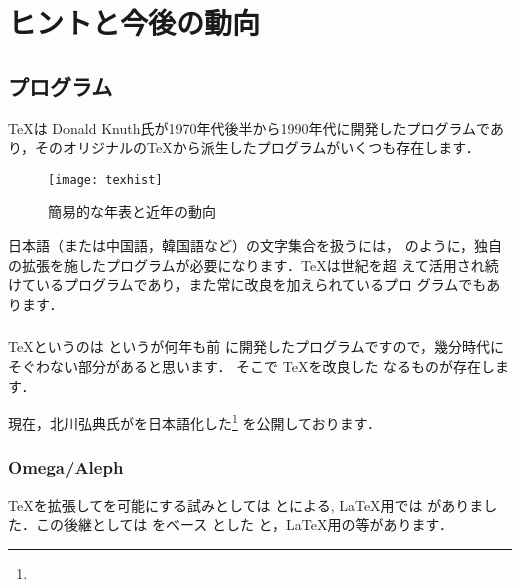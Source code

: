 \chapter{ヒントと今後の動向}

\section{プログラム}
\TeX は Donald Knuth氏が1970年代後半から1990年代に開発したプログラムであ
り，そのオリジナルの\TeX から派生したプログラムがいくつも存在します．
\begin{figure}[htbp]
 \begin{center}
  \texttt{[image: texhist]}
  \caption{簡易的な年表と近年の動向}
 \end{center}
\end{figure}
日本語（または中国語，韓国語など）の文字集合を扱うには，\pTeX
のように，独自の拡張を施したプログラムが必要になります．\TeX は世紀を超
えて活用され続けているプログラムであり，また常に改良を加えられているプロ
グラムでもあります．

\subsection{\eTeX}
\TeX というのは  というが何年も前
に開発したプログラムですので，幾分時代にそぐわない部分があると思います．
そこで \TeX を改良した \Prog[eTeX]{\eTeX} なるものが存在します．

現在，北川弘典氏が\eTeX を日本語化した\epTeX\footnote{\webEpTeX}
を公開しております．


\subsection{Omega/Aleph}

\TeX を拡張してを可能にする試みとしては
とによる,
\LaTeX 用では がありました．この後継としては \eTeX をベース
とした と，\LaTeX 用の等があります．

